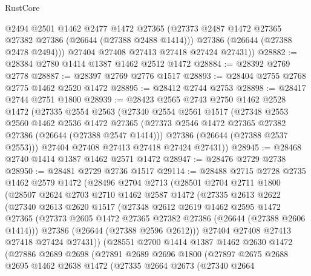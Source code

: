 \begin{lexlean}{RustCore}
\begin{coremodule}
          @2494
          @2501
          @1462
          @2477
          @1472
          @27365
          (@27373 @2487 @1472 @27365 @27382 @27386 (@26644 (@27388 @2488 @1414)))
          @27386
          (@26644 (@27388 @2478 @2494)))
        @27404
        @27408
        @27413
        @27418
        @27424
        @27431))
@28882 := @28384 @2780 @1414 @1387 @1462 @2512 @1472
@28884 := @28392 @2769 @2778
@28887 := @28397 @2769 @2776 @1517
@28893 := @28404 @2755 @2768 @2775 @1462 @2520 @1472
@28895 := @28412 @2744 @2753
@28898 := @28417 @2744 @2751 @1800
@28939 := @28423
    @2565
    @2743
    @2750
    @1462
    @2528
    @1472
    (@27335
      @2554
      @2563
      (@27340
        @2554
        @2561
        @1517
        (@27348
          @2553
          @2560
          @1462
          @2536
          @1472
          @27365
          (@27373 @2546 @1472 @27365 @27382 @27386 (@26644 (@27388 @2547 @1414)))
          @27386
          (@26644 (@27388 @2537 @2553)))
        @27404
        @27408
        @27413
        @27418
        @27424
        @27431))
@28945 := @28468 @2740 @1414 @1387 @1462 @2571 @1472
@28947 := @28476 @2729 @2738
@28950 := @28481 @2729 @2736 @1517
@29114 := @28488
    @2715
    @2728
    @2735
    @1462
    @2579
    @1472
    (@28496
      @2704
      @2713
      (@28501
        @2704
        @2711
        @1800
        (@28507
          @2624
          @2703
          @2710
          @1462
          @2587
          @1472
          (@27335
            @2613
            @2622
            (@27340
              @2613
              @2620
              @1517
              (@27348
                @2612
                @2619
                @1462
                @2595
                @1472
                @27365
                (@27373 @2605 @1472 @27365 @27382 @27386 (@26644 (@27388 @2606 @1414)))
                @27386
                (@26644 (@27388 @2596 @2612)))
              @27404
              @27408
              @27413
              @27418
              @27424
              @27431))
          (@28551
            @2700
            @1414
            @1387
            @1462
            @2630
            @1472
            (@27886
              @2689
              @2698
              (@27891
                @2689
                @2696
                @1800
                (@27897
                  @2675
                  @2688
                  @2695
                  @1462
                  @2638
                  @1472
                  (@27335
                    @2664
                    @2673
                    (@27340
                      @2664

\end{coremodule}
\end{lexlean}
